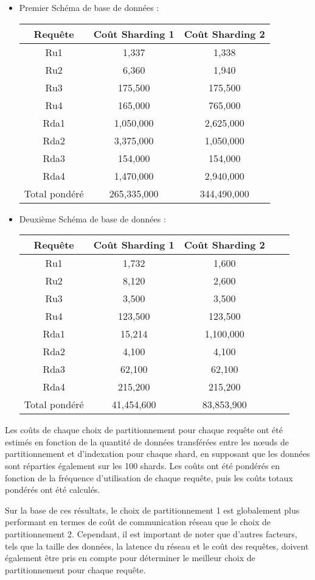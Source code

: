 \begin{itemize}
    \item Premier Schéma de base de données : 
\begin{table}[h!]
\centering
\begin{tabular}{|c|c|c|}
\hline
Requête & Coût Sharding 1 & Coût Sharding 2 \\
\hline
Ru1 & 1,337 & 1,338 \\
Ru2 & 6,360 & 1,940 \\
Ru3 & 175,500 & 175,500 \\
Ru4 & 165,000 & 765,000 \\
Rda1 & 1,050,000 & 2,625,000 \\
Rda2 & 3,375,000 & 1,050,000 \\
Rda3 & 154,000 & 154,000 \\
Rda4 & 1,470,000 & 2,940,000 \\
Total pondéré & 265,335,000 & 344,490,000 \\
\hline
\end{tabular}
\end{table}
    \item Deuxième Schéma de base de données : 

\begin{table}[h!]
\centering
\begin{tabular}{|c|c|c|c|c|}
\hline
Requête & Coût Sharding 1 & Coût Sharding 2 \\
\hline
Ru1 & 1,732 & 1,600 \\
Ru2 & 8,120 & 2,600 \\
Ru3 & 3,500 & 3,500 \\
Ru4 & 123,500 & 123,500 \\
Rda1 & 15,214 & 1,100,000 \\
Rda2 & 4,100 & 4,100  \\
Rda3 & 62,100 & 62,100 \\
Rda4 & 215,200 & 215,200  \\
Total pondéré & 41,454,600 & 83,853,900 \\
\hline
\end{tabular}
\end{table}
\end{itemize}

Les coûts de chaque choix de partitionnement pour chaque requête ont été estimés en fonction de la quantité de données transférées entre les nœuds de partitionnement et d'indexation pour chaque shard, en supposant que les données sont réparties également sur les 100 shards. Les coûts ont été pondérés en fonction de la fréquence d'utilisation de chaque requête, puis les coûts totaux pondérés ont été calculés.

Sur la base de ces résultats, le choix de partitionnement 1 est globalement plus performant en termes de coût de communication réseau que le choix de partitionnement 2. Cependant, il est important de noter que d'autres facteurs, tels que la taille des données, la latence du réseau et le coût des requêtes, doivent également être pris en compte pour déterminer le meilleur choix de partitionnement pour chaque requête.

